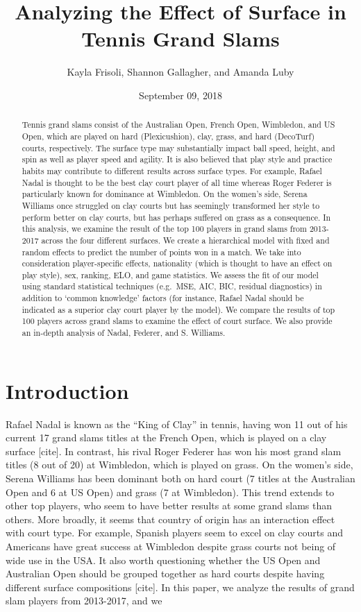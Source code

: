 \documentclass[]{article}
\title{Analyzing the Effect of Surface in Tennis Grand Slams}
\author{Kayla Frisoli, Shannon Gallagher, and Amanda Luby}
\date{September 09, 2018}
\begin{document}
\maketitle
\begin{abstract}
Tennis grand slams consist of the Australian Open, French Open,
Wimbledon, and US Open, which are played on hard (Plexicushion), clay,
grass, and hard (DecoTurf) courts, respectively. The surface type may
substantially impact ball speed, height, and spin as well as player
speed and agility. It is also believed that play style and practice
habits may contribute to different results across surface types. For
example, Rafael Nadal is thought to be the best clay court player of all
time whereas Roger Federer is particularly known for dominance at
Wimbledon. On the women's side, Serena Williams once struggled on clay
courts but has seemingly transformed her style to perform better on clay
courts, but has perhaps suffered on grass as a consequence. In this
analysis, we examine the result of the top 100 players in grand slams
from 2013-2017 across the four different surfaces. We create a
hierarchical model with fixed and random effects to predict the number
of points won in a match. We take into consideration player-specific
effects, nationality (which is thought to have an effect on play style),
sex, ranking, ELO, and game statistics. We assess the fit of our model
using standard statistical techniques (e.g.~MSE, AIC, BIC, residual
diagnostics) in addition to `common knowledge' factors (for instance,
Rafael Nadal should be indicated as a superior clay court player by the
model). We compare the results of top 100 players across grand slams to
examine the effect of court surface. We also provide an in-depth
analysis of Nadal, Federer, and S. Williams.
\end{abstract}

\hypertarget{sec:iintro}{%
\section{Introduction}\label{sec:iintro}}

Rafael Nadal is known as the ``King of Clay'' in tennis, having won 11
out of his current 17 grand slams titles at the French Open, which is
played on a clay surface {[}cite{]}. In contrast, his rival Roger
Federer has won his most grand slam titles (8 out of 20) at Wimbledon,
which is played on grass. On the women's side, Serena Williams has been
dominant both on hard court (7 titles at the Australian Open and 6 at US
Open) and grass (7 at Wimbledon). This trend extends to other top
players, who seem to have better results at some grand slams than
others. More broadly, it seems that country of origin has an interaction
effect with court type. For example, Spanish players seem to excel on
clay courts and Americans have great success at Wimbledon despite grass
courts not being of wide use in the USA. It also worth questioning
whether the US Open and Australian Open should be grouped together as
hard courts despite having different surface compositions {[}cite{]}. In
this paper, we analyze the results of grand slam players from 2013-2017,
and we
\end{document}
